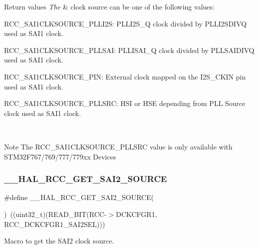 \begin{DoxyRetVals}{Return values}
{\em The} & clock source can be one of the following values\+: \begin{DoxyItemize}
\item R\+C\+C\+\_\+\+S\+A\+I1\+C\+L\+K\+S\+O\+U\+R\+C\+E\+\_\+\+P\+L\+L\+I2S\+: P\+L\+L\+I2\+S\+\_\+Q clock divided by P\+L\+L\+I2\+S\+D\+I\+VQ used as S\+A\+I1 clock. \item R\+C\+C\+\_\+\+S\+A\+I1\+C\+L\+K\+S\+O\+U\+R\+C\+E\+\_\+\+P\+L\+L\+S\+AI\+: P\+L\+L\+I\+S\+A\+I\+\_\+Q clock divided by P\+L\+L\+S\+A\+I\+D\+I\+VQ used as S\+A\+I1 clock. \item R\+C\+C\+\_\+\+S\+A\+I1\+C\+L\+K\+S\+O\+U\+R\+C\+E\+\_\+\+P\+IN\+: External clock mapped on the I2\+S\+\_\+\+C\+K\+IN pin used as S\+A\+I1 clock. \item R\+C\+C\+\_\+\+S\+A\+I1\+C\+L\+K\+S\+O\+U\+R\+C\+E\+\_\+\+P\+L\+L\+S\+RC\+: H\+SI or H\+SE depending from P\+LL Source clock used as S\+A\+I1 clock. \end{DoxyItemize}
\\
\hline
\end{DoxyRetVals}
\begin{DoxyNote}{Note}
The R\+C\+C\+\_\+\+S\+A\+I1\+C\+L\+K\+S\+O\+U\+R\+C\+E\+\_\+\+P\+L\+L\+S\+RC value is only available with S\+T\+M32\+F767/769/777/779xx Devices 
\end{DoxyNote}
\mbox{\label{group___r_c_c_ex___exported___macros_gac12f70a6d677938196f8d8a64d0c743e}} 
\subsubsection{\texorpdfstring{\_\_HAL\_RCC\_GET\_SAI2\_SOURCE}{\_\_HAL\_RCC\_GET\_SAI2\_SOURCE}}
{\footnotesize\ttfamily \#define \+\_\+\+\_\+\+H\+A\+L\+\_\+\+R\+C\+C\+\_\+\+G\+E\+T\+\_\+\+S\+A\+I2\+\_\+\+S\+O\+U\+R\+CE(\begin{DoxyParamCaption}{ }\end{DoxyParamCaption})~((uint32\+\_\+t)(R\+E\+A\+D\+\_\+\+B\+IT(R\+CC-\/$>$D\+C\+K\+C\+F\+G\+R1, R\+C\+C\+\_\+\+D\+C\+K\+C\+F\+G\+R1\+\_\+\+S\+A\+I2\+S\+EL)))}



Macro to get the S\+A\+I2 clock source. 


